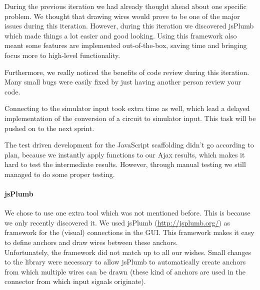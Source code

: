 \documentclass[a4paper]{article}
\begin{document}
During the previous iteration we had already thought ahead about one specific problem. We thought that drawing wires would prove to be one of the major issues during this iteration. However, during this iteration we discovered jsPlumb which made things a lot easier and good looking. Using this framework also meant some features are implemented out-of-the-box, saving time and bringing focus  more to high-level functionality.

Furthermore, we really noticed the benefits of code review during this iteration. Many small bugs were easily fixed by just having another person review your code.

Connecting to the simulator input took extra time as well, which lead a delayed implementation of the conversion of a circuit to simulator input. This task will be pushed on to the next sprint.

The test driven development for the JavaScript scaffolding didn't go according to plan, because we instantly apply functions to our Ajax results, which makes it hard to test the intermediate results. However, through manual testing we still managed to do some proper testing.


\label{jsPlumb}\paragraph{jsPlumb}
We chose to use one extra tool which was not mentioned before. This is because we only recently discovered it. We used jsPlumb (\url{http://jsplumb.org/}) as framework for the (visual) connections in the GUI. This framework makes it easy to define anchors and draw wires between these anchors. \\
Unfortunately, the framework did not match up to all our wishes. Small changes to the library were necessary to allow jsPlumb to automatically create anchors from which multiple wires can be drawn (these kind of anchors are used in the connector from which input signals originate).
\end{document}
